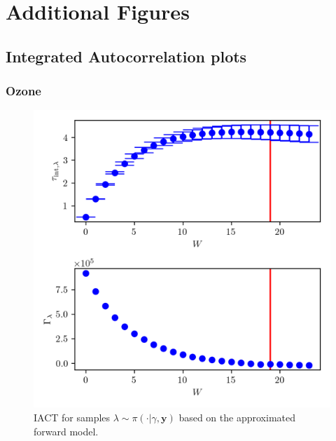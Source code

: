 \chapter{Additional Figures}
\label{ap:addFig}
 
\section{Integrated Autocorrelation plots} 
\subsection{Ozone}
\begin{figure}[ht!]
	\centering
	\includegraphics{UwerrTauIntSecO3lam.png}
	\caption[IACT and autocorrelation function for samples $\lambda \sim \pi{\cdot | \gamma, \bm{y}}$.]{IACT for samples $\lambda \sim \pi( \cdot | \gamma, \bm{y})$ based on the approximated forward model.}
	\label{fig:}
\end{figure}
